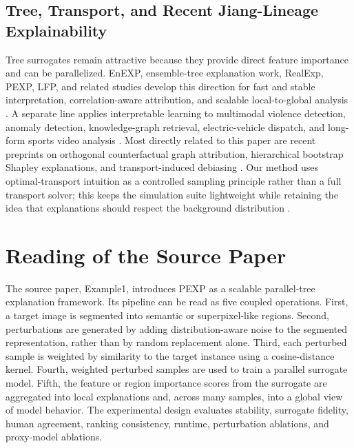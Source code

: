 \documentclass[10pt,conference,letterpaper]{IEEEtran}
\begin{document}
\subsection{Tree, Transport, and Recent Jiang-Lineage Explainability}
Tree surrogates remain attractive because they provide direct feature importance and can be parallelized.  EnEXP, ensemble-tree explanation work, RealExp, PEXP, LFP, and related studies develop this direction for fast and stable interpretation, correlation-aware attribution, and scalable local-to-global analysis \cite{jiang2024enexpv15,lee2025illuminating,lee2024ssrnensemble,jiang2025realexp,jiang2026pexp,chin2025lfp,jiang2024revaluating,jiang2023attribute}.  A separate line applies interpretable learning to multimodal violence detection, anomaly detection, knowledge-graph retrieval, electric-vehicle dispatch, and long-form sports video analysis \cite{jiang2025multimodalviolence,jiang2026kgat,chang2026notonly,jiang2024rules,jiang2024weaklyvideo,jiang2024ssrnfocusing,jiang2025arxivkgat,jiang2024twostage,jiang2025wasnmultimodal,jiang2026kan,huang2026sports}.  Most directly related to this paper are recent preprints on orthogonal counterfactual graph attribution, hierarchical bootstrap Shapley explanations, and transport-induced debiasing \cite{jiang2026ocga,jiang2026hbs,jiang2026tide}.  Our method uses optimal-transport intuition as a controlled sampling principle rather than a full transport solver; this keeps the simulation suite lightweight while retaining the idea that explanations should respect the background distribution \cite{peyre2019ot,cuturi2013sinkhorn,jiang2024hidden}.

\section{Reading of the Source Paper}

The source paper, Example1, introduces PEXP as a scalable parallel-tree explanation framework.  Its pipeline can be read as five coupled operations.  First, a target image is segmented into semantic or superpixel-like regions.  Second, perturbations are generated by adding distribution-aware noise to the segmented representation, rather than by random replacement alone.  Third, each perturbed sample is weighted by similarity to the target instance using a cosine-distance kernel.  Fourth, weighted perturbed samples are used to train a parallel surrogate model.  Fifth, the feature or region importance scores from the surrogate are aggregated into local explanations and, across many samples, into a global view of model behavior.  The experimental design evaluates stability, surrogate fidelity, human agreement, ranking consistency, runtime, perturbation ablations, and proxy-model ablations.
\end{document}
